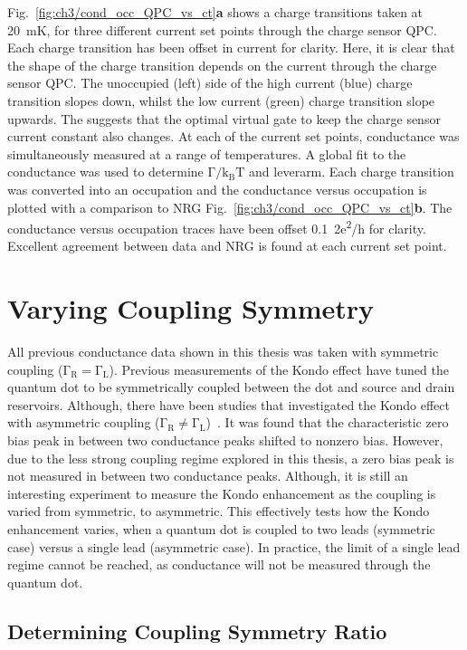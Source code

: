 Fig.~\ref{fig:ch3/cond_occ_QPC_vs_ct}\textbf{a} shows a charge transitions taken at \qty{20}{mK}, for three different current set points through the charge sensor QPC. Each charge transition has been offset in current for clarity. Here, it is clear that the shape of the charge transition depends on the current through the charge sensor QPC. The unoccupied (left) side of the high current (blue) charge transition slopes down, whilst the low current (green) charge transition slope upwards. The suggests that the optimal virtual gate to keep the charge sensor current constant also changes. At each of the current set points, conductance was simultaneously measured at a range of temperatures. A global fit to the conductance was used to determine $\mathrm{\Gamma/k_BT}$ and leverarm. Each charge transition was converted into an occupation and the conductance versus occupation is plotted with a comparison to NRG Fig.~\ref{fig:ch3/cond_occ_QPC_vs_ct}\textbf{b}. The conductance versus occupation traces have been offset \qty{0.1}{2e^2/h} for clarity. Excellent agreement between data and NRG is found at each current set point. 


\section{Varying Coupling Symmetry}

All previous conductance data shown in this thesis was taken with symmetric coupling ($\mathrm{\Gamma_R = \Gamma_L}$). Previous measurements of the Kondo effect have tuned the quantum dot to be symmetrically coupled between the dot and source and drain reservoirs. Although, there have been studies that investigated the Kondo effect with asymmetric coupling ($\mathrm{\Gamma_R \neq \Gamma_L}$)~\cite{kondo_asymmetric}. It was found that the characteristic zero bias peak in between two conductance peaks shifted to nonzero bias. However, due to the less strong coupling regime explored in this thesis, a zero bias peak is not measured in between two conductance peaks. Although, it is still an interesting experiment to measure the Kondo enhancement as the coupling is varied from symmetric, to asymmetric. This effectively tests how the Kondo enhancement varies, when a quantum dot is coupled to two leads (symmetric case) versus a single lead (asymmetric case). In practice, the limit of a single lead regime cannot be reached, as conductance will not be measured through the quantum dot.


\subsection{Determining Coupling Symmetry Ratio}


